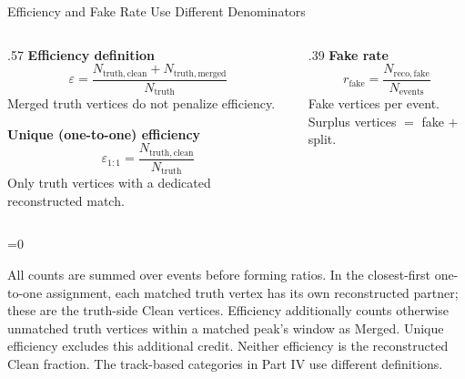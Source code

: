 \documentclass[xcolor=table,aspectratio=169]{beamer}
\providecommand{\talkbuild}{0}
\newcommand{\readingonly}[1]{\ifnum\talkbuild=0\relax#1\fi}
\newcommand{\readingnote}[1]{\readingonly{\par\vspace{.35em}%
  {\footnotesize\color{black!65}#1\par}}}
\begin{document}
\begin{frame}{Efficiency and Fake Rate Use Different Denominators}
\relax

\begin{columns}[t]
\begin{column}{.57\linewidth}\centering\small
\textbf{Efficiency definition}
\[\varepsilon=\frac{N_{\mathrm{truth,clean}}+N_{\mathrm{truth,merged}}}{N_{\mathrm{truth}}}\]
Merged truth vertices do not penalize efficiency.
\par\vspace{.9em}
\textbf{Unique (one-to-one) efficiency}
\[\varepsilon_{1:1}=\frac{N_{\mathrm{truth,clean}}}{N_{\mathrm{truth}}}\]
Only truth vertices with a dedicated reconstructed match.
\end{column}
\begin{column}{.39\linewidth}\centering\small
\textbf{Fake rate}
\[r_{\mathrm{fake}}=\frac{N_{\mathrm{reco,fake}}}{N_{\mathrm{events}}}\]
Fake vertices per event.\\[.9em]
Surplus vertices $=$ fake $+$ split.
\end{column}\end{columns}
\readingnote{All counts are summed over events before forming ratios. In the closest-first one-to-one assignment, each matched truth vertex has its own reconstructed partner; these are the truth-side Clean vertices. Efficiency additionally counts otherwise unmatched truth vertices within a matched peak's window as Merged. Unique efficiency excludes this additional credit. Neither efficiency is the reconstructed Clean fraction. The track-based categories in Part IV use different definitions.}

\end{frame}
\end{document}
